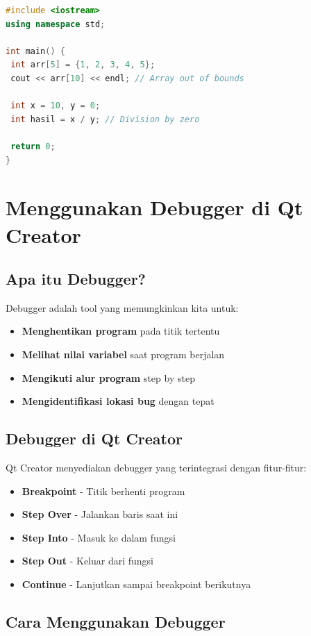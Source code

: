 \begin{lstlisting}[language=c++, caption=Contoh Runtime Error]
#include <iostream>
using namespace std;

int main() {
 int arr[5] = {1, 2, 3, 4, 5};
 cout << arr[10] << endl; // Array out of bounds

 int x = 10, y = 0;
 int hasil = x / y; // Division by zero

 return 0;
}
\end{lstlisting}

\section{Menggunakan Debugger di Qt Creator}

\subsection{Apa itu Debugger?}

Debugger adalah tool yang memungkinkan kita untuk:
\begin{itemize}
\item \textbf{Menghentikan program} pada titik tertentu
\item \textbf{Melihat nilai variabel} saat program berjalan
\item \textbf{Mengikuti alur program} step by step
\item \textbf{Mengidentifikasi lokasi bug} dengan tepat
\end{itemize}

\subsection{Debugger di Qt Creator}

Qt Creator menyediakan debugger yang terintegrasi dengan fitur-fitur:

\begin{itemize}
\item \textbf{Breakpoint} - Titik berhenti program
\item \textbf{Step Over} - Jalankan baris saat ini
\item \textbf{Step Into} - Masuk ke dalam fungsi
\item \textbf{Step Out} - Keluar dari fungsi
\item \textbf{Continue} - Lanjutkan sampai breakpoint berikutnya
\end{itemize}

\subsection{Cara Menggunakan Debugger}

